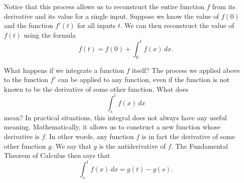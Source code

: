 \documentclass{math-deane}
\begin{document}
Notice that this process allows us to reconstruct the entire function $f$ from its derivative and its value for a single input. Suppose we know the value of $f(0)$ and the function $f'(t)$ for all inputs $t$. We can then reconstruct the value of $f(t)$ using the formula
\[
f(t) = f(0) + \int_0^t f(x)\,dx.
\]

What happens if we integrate a function $f$ itself? The process we applied above to the function $f'$ can be applied to any function, even if the function is not known to be the derivative of some other function. What does
\[
\int_s^t f(x)\,dx
\]
mean? In practical situations, this integral does not always have any useful meaning. Mathematically, it allows us to construct a new function whose derivative is $f$. In other words, any function $f$ is in fact the derivative of some other function $g$. We say that $g$ is the antiderivative of $f$. The Fundamental Theorem of Calculus then says that
\[
\int_s^t f(x)\,dx = g(t) - g(s).
\]
\end{document}
